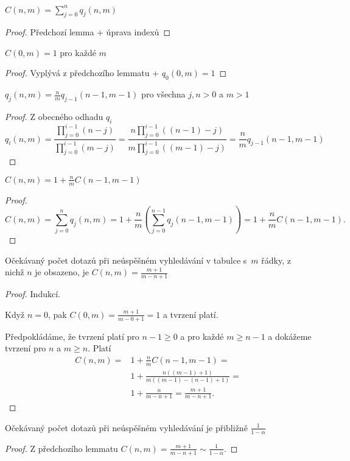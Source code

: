 \documentclass[a4paper,12pt]{article}
\begin{document}
\begin{lemma}
    $C(n,m)=\sum_{j=0}^{n}q_j(n,m)$
\end{lemma}
\begin{proof}
    Předchozí lemma + úprava indexů
\end{proof}

\begin{lemma}
    $C(0,m)=1$ pro každé $m$
\end{lemma}
\begin{proof}
     Vyplývá z předchozího lemmatu + $q_0(0,m)=1$
\end{proof}   

\begin{lemma}
    $q_j(n,m)=\frac nmq_{j-1}(n-1,m-1)$ pro všechna $j,n>0$ a $m>1$
\end{lemma}
\begin{proof}
     Z obecného odhadu $q_i$ $$q_i(n,m)=\frac {\prod_{j=0}^{i-1}(n-j)}{\prod_{j=0}^{i-1}(m-j)} = \frac {n\prod_{j=0}^{i-1}((n-1)-j)}{m\prod_{j=0}^{i-1}((m-1)-j)}=\frac nmq_{j-1}(n-1,m-1)$$
\end{proof}

\begin{lemma}
    $C(n,m)=1+\frac nmC(n-1,m-1)$
\end{lemma}
\begin{proof}
    $$C(n,m)=\sum_{j=0}^nq_j(n,m)=1+\frac nm(\sum_{j=0}^{n-1}q_j(n-1,
    m-1))=1+\frac nmC(n-1,m-1).$$
\end{proof}

\begin{lemma}
    Očekávaný počet dotazů při neúspěšném 
    vyhledávání v tabulce s~$m$ řádky, z nichž $n$ je obsazeno, je $C(n,m)=\frac {m+1}{m-n
    +1}$
\end{lemma}
\begin{proof}
Indukcí. 

Když $n=0$, pak 
$C(0,m)=\frac {m+1}{m-0+1}=1$ a tvrzení platí.

Předpokládáme, že tvrzení 
platí pro $n-1\ge 0$ a pro každé $m\ge n-1$ a dokážeme tvrzení 
pro $n$ a $m\ge n$. Platí
\begin{align*} C(n,m)=&1+\frac nmC(n-1,m-1)=\\
&1+\frac {n((m-1)+1)}{m((m-1)-(n-1)+1)}=\\
&1+\frac n{m-n+1}=\frac {m+1}{m-n+1}.\end{align*}
\end{proof}

\begin{veta}
    Očekávaný počet dotazů při neúspěšném 
    vyhledávání je přibližně $\frac 1{1-\alpha}$
\end{veta}
\begin{proof}
    Z předchozího lemmatu $C(n,m) = \frac {m+1}{m-n+1} \sim \frac 1{1-\alpha}$.
\end{proof}
\end{document}
